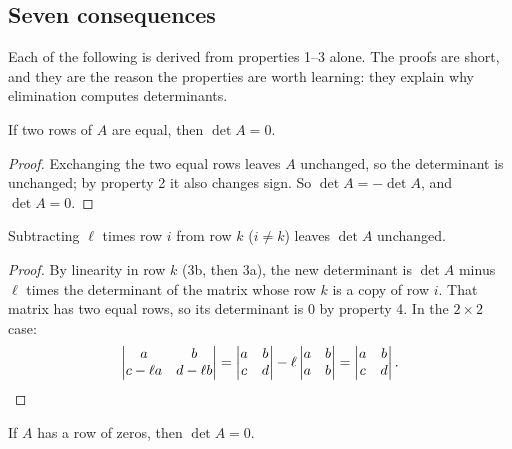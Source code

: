 \subsection{Seven consequences}

Each of the following is derived from properties 1--3 alone. The proofs are short, and they
are the reason the properties are worth learning: they explain why elimination computes
determinants.

\begin{proposition}\label{prop:u20-equal}
If two rows of $A$ are equal, then $\det A=0$.
\end{proposition}

\begin{proof}
Exchanging the two equal rows leaves $A$ unchanged, so the determinant is unchanged; by
property 2 it also changes sign. So $\det A=-\det A$, and $\det A=0$.
\end{proof}

\begin{proposition}\label{prop:u20-elim}
Subtracting $\ell$ times row $i$ from row $k$ ($i\neq k$) leaves $\det A$ unchanged.
\end{proposition}

\begin{proof}
By linearity in row $k$ (3b, then 3a), the new determinant is $\det A$ minus $\ell$ times the
determinant of the matrix whose row $k$ is a copy of row $i$. That matrix has two equal rows,
so its determinant is $0$ by property 4. In the $2\times 2$ case:
\[
  \begin{vmatrix}a&b\\c-\ell a&d-\ell b\end{vmatrix}
  =\begin{vmatrix}a&b\\c&d\end{vmatrix}-\ell\begin{vmatrix}a&b\\a&b\end{vmatrix}
  =\begin{vmatrix}a&b\\c&d\end{vmatrix}.\qedhere
\]
\end{proof}

\begin{proposition}\label{prop:u20-zero}
If $A$ has a row of zeros, then $\det A=0$.
\end{proposition}

